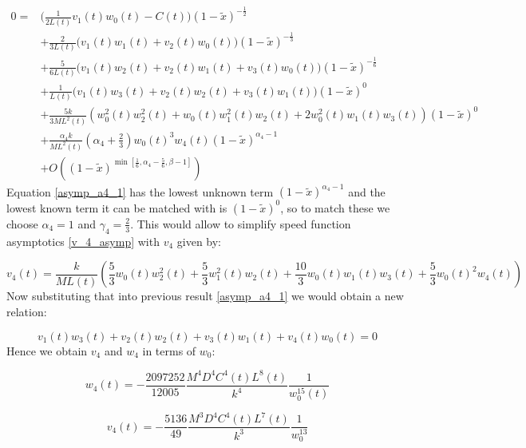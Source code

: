 \begin{equation}
\begin{split}0= & \big(\frac{1}{2L(t)}v_{1}(t)w_{0}(t)-C(t)\big)(1-\tilde{x})^{-\frac{1}{2}}\\
 & +\frac{2}{3L(t)}\big(v_{1}(t)w_{1}(t)+v_{2}(t)w_{0}(t)\big)(1-\tilde{x})^{-\frac{1}{3}}\\
 & +\frac{5}{6L(t)}\big(v_{1}(t)w_{2}(t)+v_{2}(t)w_{1}(t)+v_{3}(t)w_{0}(t)\big)(1-\tilde{x})^{-\frac{1}{6}}\\
 & +\frac{1}{L(t)}\big(v_{1}(t)w_{3}(t)+v_{2}(t)w_{2}(t)+v_{3}(t)w_{1}(t)\big)(1-\tilde{x})^{0}\\
 & +\frac{5k}{3ML^2(t)}\left(w_{0}^{2}(t)w_{2}^{2}(t)+w_{0}(t)w_{1}^{2}(t)w_{2}(t)+2w_{0}^{2}(t)w_{1}(t)w_{3}(t)\right)(1-\tilde{x})^{0}\\
 & +\frac{\alpha_{4}k}{ML^2(t)}\left(\alpha_{4}+\frac{2}{3}\right)w_{0}(t)^{3}w_{4}(t)(1-\tilde{x})^{\alpha_{4}-1}\\
 & +O\left((1-\tilde{x})^{\min{[\frac{1}{6},\alpha_{4}-\frac{5}{6},\beta-1]}}\right)
\end{split}
\label{asymp_a4_1}
\end{equation}
Equation \eqref{asymp_a4_1} has the lowest unknown term $(1-\tilde{x})^{\alpha_{4}-1}$ and the lowest known term it can be matched with is $(1-\tilde{x})^{0}$, so to match these we choose $\alpha_{4}=1$ and $\gamma_{4}=\frac{2}{3}$. This would allow to simplify speed function asymptotics \eqref{v_4_asymp} with $v_4$ given by:

\begin{equation}
v_{4}(t)=\frac{k}{ML(t)}\left(\frac{5}{3}w_{0}(t)w_{2}^{2}(t)+\frac{5}{3}w_{1}^{2}(t)w_{2}(t)+\frac{10}{3}w_{0}(t)w_{1}(t)w_{3}(t)+\frac{5}{3}w_{0}(t)^{2}w_{4}(t)\right)\label{v_4}
\end{equation}
Now substituting that into previous result \eqref{asymp_a4_1} we would obtain a new relation:

\begin{equation}
v_{1}(t)w_{3}(t)+v_{2}(t)w_{2}(t)+v_{3}(t)w_{1}(t)+v_{4}(t)w_{0}(t)=0\label{relation_4}
\end{equation}
Hence we obtain $v_4$ and $w_4$ in terms of $w_0$:

\begin{equation}
w_{4}(t)=-\frac{2097252}{12005}\frac{M^4D^4C^4(t)L^8(t)}{k^4}\frac{1}{w_{0}^{15}(t)}\label{w_4}
\end{equation}

\begin{equation}
v_{4}(t)=-\frac{5136}{49}\frac{M^{3}D^{4}C^{4}(t)L^{7}(t)}{k^{3}}\frac{1}{w_{0}^{13}}\label{v_4}
\end{equation}

